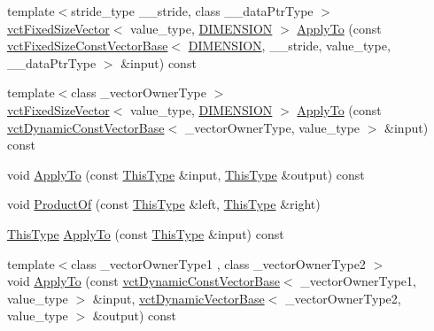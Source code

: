 \begin{DoxyCompactItemize}
\item 
{\footnotesize template$<$stride\+\_\+type \+\_\+\+\_\+stride, class \+\_\+\+\_\+data\+Ptr\+Type $>$ }\\\hyperlink{classvct_fixed_size_vector}{vct\+Fixed\+Size\+Vector}$<$ value\+\_\+type, \hyperlink{classvct_frame_base_a4284a4e875533c13df90a20c0233e043ad25b85efd5e4c2687ddf38ae18cd88f0}{D\+I\+M\+E\+N\+S\+I\+O\+N} $>$ \hyperlink{classvct_frame_base_a107a8223a3b6f746ec7c70ff5ca1c144}{Apply\+To} (const \hyperlink{classvct_fixed_size_const_vector_base}{vct\+Fixed\+Size\+Const\+Vector\+Base}$<$ \hyperlink{classvct_frame_base_a4284a4e875533c13df90a20c0233e043ad25b85efd5e4c2687ddf38ae18cd88f0}{D\+I\+M\+E\+N\+S\+I\+O\+N}, \+\_\+\+\_\+stride, value\+\_\+type, \+\_\+\+\_\+data\+Ptr\+Type $>$ \&input) const 
\item 
{\footnotesize template$<$class \+\_\+vector\+Owner\+Type $>$ }\\\hyperlink{classvct_fixed_size_vector}{vct\+Fixed\+Size\+Vector}$<$ value\+\_\+type, \hyperlink{classvct_frame_base_a4284a4e875533c13df90a20c0233e043ad25b85efd5e4c2687ddf38ae18cd88f0}{D\+I\+M\+E\+N\+S\+I\+O\+N} $>$ \hyperlink{classvct_frame_base_a0d5a9a6b0190d72b226d442f4f83e577}{Apply\+To} (const \hyperlink{classvct_dynamic_const_vector_base}{vct\+Dynamic\+Const\+Vector\+Base}$<$ \+\_\+vector\+Owner\+Type, value\+\_\+type $>$ \&input) const 
\item 
void \hyperlink{classvct_frame_base_a3159263c3424f7673426c24bdb081b9f}{Apply\+To} (const \hyperlink{classvct_frame_base_a076f1fe4fc957faa0d1ff7450d1cb768}{This\+Type} \&input, \hyperlink{classvct_frame_base_a076f1fe4fc957faa0d1ff7450d1cb768}{This\+Type} \&output) const 
\item 
void \hyperlink{classvct_frame_base_ae85dc1fd8143bc54a0e4288beacedfde}{Product\+Of} (const \hyperlink{classvct_frame_base_a076f1fe4fc957faa0d1ff7450d1cb768}{This\+Type} \&left, \hyperlink{classvct_frame_base_a076f1fe4fc957faa0d1ff7450d1cb768}{This\+Type} \&right)
\item 
\hyperlink{classvct_frame_base_a076f1fe4fc957faa0d1ff7450d1cb768}{This\+Type} \hyperlink{classvct_frame_base_abf5a72bd336913d83360b998d392c384}{Apply\+To} (const \hyperlink{classvct_frame_base_a076f1fe4fc957faa0d1ff7450d1cb768}{This\+Type} \&input) const 
\item 
{\footnotesize template$<$class \+\_\+vector\+Owner\+Type1 , class \+\_\+vector\+Owner\+Type2 $>$ }\\void \hyperlink{classvct_frame_base_ac74dec733db581ea55c2c6e7d22efab6}{Apply\+To} (const \hyperlink{classvct_dynamic_const_vector_base}{vct\+Dynamic\+Const\+Vector\+Base}$<$ \+\_\+vector\+Owner\+Type1, value\+\_\+type $>$ \&input, \hyperlink{classvct_dynamic_vector_base}{vct\+Dynamic\+Vector\+Base}$<$ \+\_\+vector\+Owner\+Type2, value\+\_\+type $>$ \&output) const 

\end{DoxyCompactItemize}
